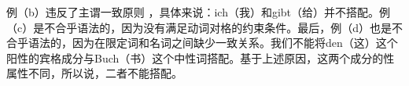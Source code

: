 \zl
例（b）违反了主谓一致原则 ，具体来说：ich（我）和gibt（给）并不搭配。例（c）是不合乎语法的，因为没有满足动词对格的约束条件。最后，例（d）也是不合乎语法的，因为在限定词和名词之间缺少一致关系。我们不能将den（这）这个阳性的宾格成分与Buch（书）这个中性词搭配。基于上述原因，这两个成分的性属性不同，所以说，二者不能搭配。

